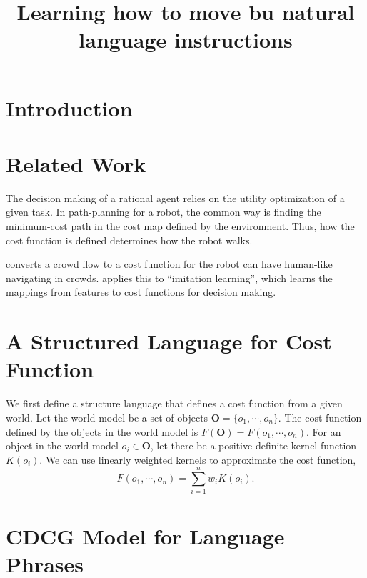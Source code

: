 \documentclass[10pt,a4paper]{article}
\begin{document}
\title{Learning how to move bu natural language instructions}	
\author{}
\date{}
\maketitle

\section{Introduction}




\section{Related Work}

The decision making of a rational agent relies on the utility optimization of a given task.
In path-planning for a robot, the common way is finding the minimum-cost path in the cost map defined by the environment.
Thus, how the cost function is defined determines how the robot walks.

\cite{5509772} converts a crowd flow to a cost function for the robot can have human-like navigating in crowds.
\cite{Ratliff:2006:MMP:1143844.1143936} applies this to ``imitation learning'', which learns the mappings from features to cost functions for decision making.

\cite{AAAI159766}

\section{A Structured Language for Cost Function}

We first define a structure language that defines a cost function from a given world.
Let the world model be a set of objects $ \bm{O} = \{ o_1 , \cdots , o_n \} $.
The cost function defined by the objects in the world model is $ F( \bm{O} ) = F( o_1 , \cdots , o_n ) $.
For an object in the world model $ o_i \in \bm{O} $, let there be a positive-definite kernel function $ K( o_i ) $.
We can use linearly weighted kernels to approximate the cost function,
\begin{equation}
\label{eq:kernel_approx}
F( o_1 , \cdots , o_n ) = \sum_{i=1}^{n} w_i K( o_i ).
\end{equation}


\section{CDCG Model for Language Phrases}
\end{document}
